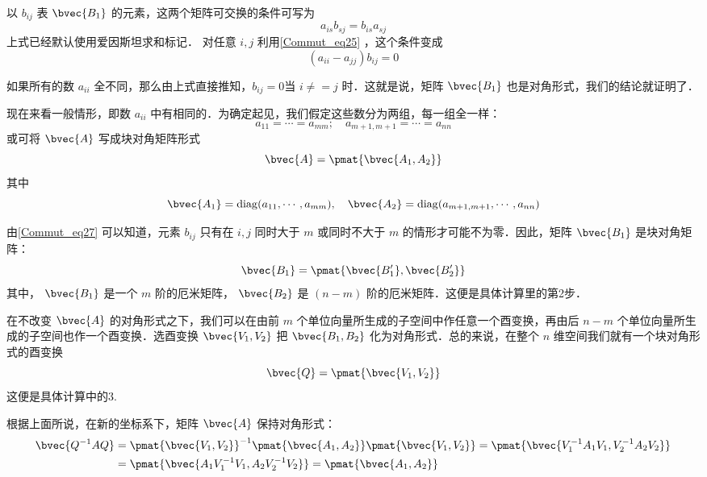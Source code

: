 以 $b_{ij}$ 表 $\bvec{B_1}$ 的元素，这两个矩阵可交换的条件可写为
\begin{equation}
a_{is}b_{sj}=b_{is}a_{sj}
\end{equation}
上式已经默认使用爱因斯坦求和标记．
对任意 $i,j$ 利用\autoref{Commut_eq25} ，这个条件变成
\begin{equation}
(a_{ii}-a_{jj})b_{ij}=0
\label{Commut_eq27}
\end{equation}

如果所有的数 $a_{ii}$ 全不同，那么由上式直接推知，$b_{ij}=0$当 $i\neq=j$ 时．这就是说，矩阵 $\bvec{B_1}$ 也是对角形式，我们的结论就证明了．

现在来看一般情形，即数 $a_{ii}$ 中有相同的．为确定起见，我们假定这些数分为两组，每一组全一样：
\begin{equation}
a_{11}=\cdots=a_{mm};\quad a_{m+1,m+1}=\cdots=a_{nn}
\end{equation}
或可将 $\bvec{A}$ 写成块对角矩阵形式
\begin{equation}
\bvec{A}=\pmat{\bvec{A_1,A_2}}
\end{equation}
其中
\begin{equation}
\bvec{A_1}=\mathrm{diag}(a_{11},\cdots,a_{mm}),\quad
\bvec{A_2}=\mathrm{diag}(a_{m+1,m+1},\cdots,a_{nn})
\end{equation}

由\autoref{Commut_eq27} 可以知道，元素 $b_{ij}$ 只有在 $i,j$ 同时大于 $m$ 或同时不大于 $m$ 的情形才可能不为零．因此，矩阵 $\bvec{B_1}$ 是块对角矩阵：
\begin{equation}
\bvec{B_1}=\pmat{\bvec{B'_1},\bvec{B'_2}}
\end{equation}
其中， $\bvec{B_1}$ 是一个 $m$ 阶的厄米矩阵， $\bvec{B_2}$ 是 $(n-m)$ 阶的厄米矩阵．这便是具体计算里的第2步．

在不改变 $\bvec{A}$ 的对角形式之下，我们可以在由前 $m$ 个单位向量所生成的子空间中作任意一个酉变换，再由后 $n-m$ 个单位向量所生成的子空间也作一个酉变换．选酉变换 $\bvec{V_1,V_2}$ 把 $\bvec{B_1,B_2}$ 化为对角形式．总的来说，在整个 $n$ 维空间我们就有一个块对角形式的酉变换
\begin{equation}
\bvec{Q}=\pmat{\bvec{V_1,V_2}}
\end{equation}
这便是具体计算中的3.

根据上面所说，在新的坐标系下，矩阵 $\bvec{A}$ 保持对角形式：
\begin{equation}
\begin{aligned}
\bvec{Q^{-1}AQ}&=\pmat{\bvec{V_1,V_2}}^{-1}\pmat{\bvec{A_1,A_2}}\pmat{\bvec{V_1,V_2}}=\pmat{\bvec{V_1^{-1}A_1V_1,V_2^{-1}A_2V_2}}\\
&=\pmat{\bvec{A_1V_1^{-1}V_1,A_2V_2^{-1}V_2}}=\pmat{\bvec{A_1,A_2}}
\end{aligned}
\end{equation}

